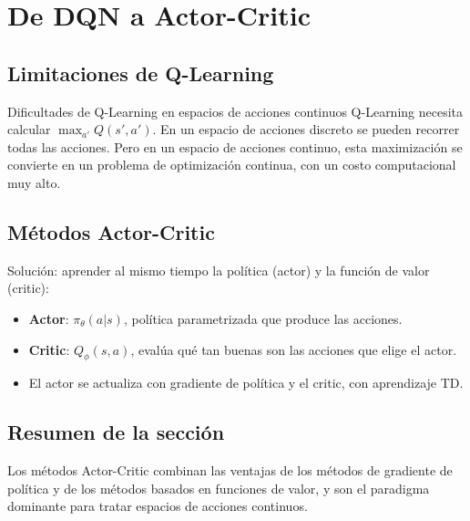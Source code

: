 \section{De DQN a Actor-Critic}

\subsection{Limitaciones de Q-Learning}

\begin{warningbox}{Dificultades de Q-Learning en espacios de acciones continuos}
Q-Learning necesita calcular $\max_{a'} Q(s', a')$. En un espacio de acciones discreto se pueden recorrer todas las acciones. Pero en un espacio de acciones continuo, esta maximización se convierte en un problema de optimización continua, con un costo computacional muy alto.
\end{warningbox}

\subsection{Métodos Actor-Critic}

Solución: aprender al mismo tiempo la política (actor) y la función de valor (critic):
\begin{itemize}
    \item \textbf{Actor}: $\pi_\theta(a|s)$, política parametrizada que produce las acciones.
    \item \textbf{Critic}: $Q_\phi(s, a)$, evalúa qué tan buenas son las acciones que elige el actor.
    \item El actor se actualiza con gradiente de política y el critic, con aprendizaje TD.
\end{itemize}

\subsection{Resumen de la sección}

Los métodos Actor-Critic combinan las ventajas de los métodos de gradiente de política y de los métodos basados en funciones de valor, y son el paradigma dominante para tratar espacios de acciones continuos.


